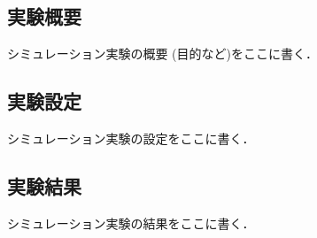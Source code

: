 \subsection{実験概要}
シミュレーション実験の概要 (目的など)をここに書く．

\subsection{実験設定}
シミュレーション実験の設定をここに書く．

\subsection{実験結果}
シミュレーション実験の結果をここに書く．
